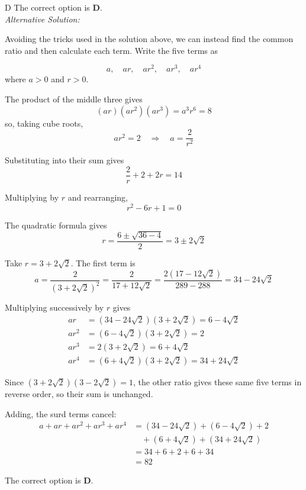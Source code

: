 \documentclass[11pt,a4paper]{article}
\begin{document}
\begin{enumerate}[label=\textbf{\arabic*.},leftmargin=*,itemsep=0pt,start=8]
\begin{djsSolution}{D}
The correct option is \textbf{D}.\\[5pt]

\textit{Alternative Solution:}

Avoiding the tricks used in the solution above, we can instead find the common ratio and then calculate each term. Write the five terms as

\[
a,\quad ar,\quad ar^2,\quad ar^3,\quad ar^4
\]
where $a>0$ and $r>0$.

The product of the middle three gives
\[
(ar)(ar^2)(ar^3)=a^3r^6=8
\]
so, taking cube roots,
\[
ar^2=2\quad\Longrightarrow\quad a=\frac{2}{r^2}
\]

Substituting into their sum gives
\[
\frac{2}{r}+2+2r=14
\]

Multiplying by $r$ and rearranging,
\[
r^2-6r+1=0
\]

The quadratic formula gives
\[
r=\frac{6\pm\sqrt{36-4}}{2}=3\pm2\sqrt2
\]

Take $r=3+2\sqrt2$. The first term is
\[
a=\frac{2}{(3+2\sqrt2)^2}
=\frac{2}{17+12\sqrt2}
=\frac{2(17-12\sqrt2)}{289-288}
=34-24\sqrt2
\]

Multiplying successively by $r$ gives
\[
\begin{aligned}
ar&=(34-24\sqrt2)(3+2\sqrt2)=6-4\sqrt2\\[5pt]
ar^2&=(6-4\sqrt2)(3+2\sqrt2)=2\\[5pt]
ar^3&=2(3+2\sqrt2)=6+4\sqrt2\\[5pt]
ar^4&=(6+4\sqrt2)(3+2\sqrt2)=34+24\sqrt2
\end{aligned}
\]

Since $(3+2\sqrt2)(3-2\sqrt2)=1$, the other ratio gives these same five terms in reverse order, so their sum is unchanged.

Adding, the surd terms cancel:
\[
\begin{aligned}
a+ar+ar^2+ar^3+ar^4
&=(34-24\sqrt2)+(6-4\sqrt2)+2\\[5pt]
&\quad +(6+4\sqrt2)+(34+24\sqrt2)\\[5pt]
&=34+6+2+6+34\\[5pt]
&=82
\end{aligned}
\]

The correct option is \textbf{D}.
\end{djsSolution}
\end{enumerate}
\clearpage
\thispagestyle{djssolutions}
\vspace*{8pt}
\end{document}
